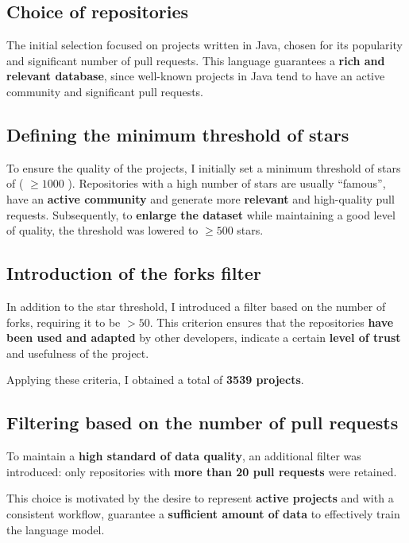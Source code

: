 \subsection{Choice of repositories}
The initial selection focused on projects written in Java, chosen for its popularity and significant number of pull requests. This language guarantees a \textbf{rich and relevant database}, since well-known projects in Java tend to have an active community and significant pull requests.

\subsection{Defining the minimum threshold of stars}
To ensure the quality of the projects, I initially set a minimum threshold of stars of ( $\geq 1000$ ). Repositories with a high number of stars are usually ``famous'', have an \textbf{active community} and generate more \textbf{relevant} and high-quality pull requests.
Subsequently, to \textbf{enlarge the dataset} while maintaining a good level of quality, the threshold was lowered to \( \geq 500 \) stars.

\subsection{Introduction of the forks filter}
In addition to the star threshold, I introduced a filter based on the number of forks, requiring it to be $> 50$. This criterion ensures that the repositories \textbf{have been used and adapted} by other developers, indicate a certain \textbf{level of trust} and usefulness of the project.

Applying these criteria, I obtained a total of \textbf{3539 projects}.

\subsection{Filtering based on the number of pull requests}
To maintain a \textbf{high standard of data quality}, an additional filter was introduced: only repositories with \textbf{more than 20 pull requests} were retained.

This choice is motivated by the desire to represent \textbf{active projects} and with a consistent workflow, guarantee a \textbf{sufficient amount of data} to effectively train the language model.

